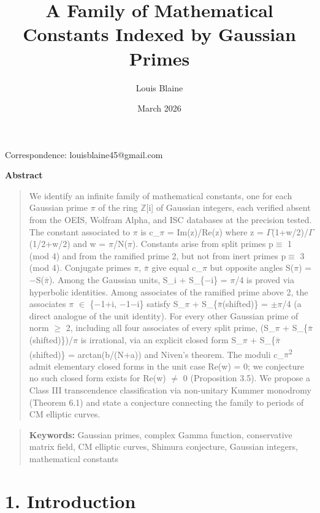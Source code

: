 \documentclass[11pt]{article}
\makeatletter
\renewcommand\maketitle{%
  \begingroup
  \begin{center}
    \LARGE\bfseries \@title \par
  \end{center}
  \ifx\@subtitle\@empty\else
    \vspace{0.4em}
    \begin{center}
      \itshape \@subtitle \par
    \end{center}
  \fi
  \vspace{0.6em}
  \begin{center}
    \@author \par
    \vspace{0.2em}
    Correspondence: \@correspondence \par
    \vspace{0.2em}
    \@date \par
  \end{center}
  \vspace{1em}
  \endgroup
}
\def\@subtitle{}
\def\@correspondence{}
\newcommand{\correspondenceX}[1]{\def\@correspondence{#1}}
\renewenvironment{abstract}{%
  \begin{center}\bfseries Abstract\end{center}%
  \begin{quote}\setlength{\parindent}{0pt}}{\end{quote}\medskip}
\newcommand{\keywordsX}[1]{%
  \begin{quote}\setlength{\parindent}{0pt}\textbf{Keywords:} #1\end{quote}}
\makeatother
\begin{document}
\title{A Family of Mathematical Constants Indexed by Gaussian Primes}

\author{Louis Blaine}
\correspondenceX{louisblaine45@gmail.com}
\date{March 2026}

\maketitle

\begin{abstract}
We identify an infinite family of mathematical constants, one for each
Gaussian prime \(\pi\) of the ring \(\mathbb{Z}\){[}i{]} of Gaussian
integers, each verified absent from the OEIS, Wolfram Alpha, and ISC
databases at the precision tested. The constant associated to \(\pi\) is
c\_\(\pi\) = \textbar Im(z)/Re(z)\textbar{} where z =
\(\Gamma\)(1+w/2)/\(\Gamma\)(1/2+w/2) and w = \(\pi\)/N(\(\pi\)).
Constants arise from split primes p\(\equiv\) 1 (mod 4) and from the
ramified prime 2, but not from inert primes p\(\equiv\) 3 (mod 4).
Conjugate primes \(\pi\), \(\bar{\pi}\) give equal
\textbar c\_\(\pi\)\textbar{} but opposite angles S(\(\pi\)) =
−S(\(\bar{\pi}\)). Among the Gaussian units, S\_i + S\_\{−i\} =
\(\pi\)/4 is proved via hyperbolic identities. Among associates of the
ramified prime above 2, the associates \(\pi\) \(\in\) \{−1+i, −1−i\}
satisfy S\_\(\pi\) + S\_\{\(\bar{\pi}\)(shifted)\} = \(\pm \pi\)/4 (a
direct analogue of the unit identity). For every other Gaussian prime of
norm \(\geq\) 2, including all four associates of every split prime,
(S\_\(\pi\) + S\_\{\(\bar{\pi}\)(shifted)\})/\(\pi\) is irrational, via
an explicit closed form S\_\(\pi\) + S\_\{\(\bar{\pi}\)(shifted)\} =
arctan(b/(N+a)) and Niven's theorem. The moduli
\textbar c\_\(\pi\)\textbar{}\textsuperscript{2} admit elementary closed
forms in the unit case Re(w) = 0; we conjecture no such closed form
exists for Re(w) \(\neq\) 0 (Proposition 3.5). We propose a Class III
transcendence classification via non-unitary Kummer monodromy (Theorem
6.1) and state a conjecture connecting the family to periods of CM
elliptic curves.
\end{abstract}

\keywordsX{Gaussian primes, complex Gamma function, conservative matrix
field, CM elliptic curves, Shimura conjecture, Gaussian integers,
mathematical constants}

\hypertarget{introduction}{%
\section{1. Introduction}\label{introduction}}
\end{document}
